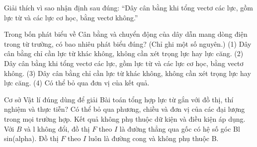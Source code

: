 \begin{bt}
Giải thích vì sao nhận định sau đúng: “Dây cân bằng khi tổng vectơ các lực, gồm lực từ và các lực cơ học, bằng vectơ không.”
\end{bt}

\begin{ex}
Trong bốn phát biểu về Cân bằng và chuyển động của dây dẫn mang dòng điện trong từ trường, có bao nhiêu phát biểu đúng? (Chỉ ghi một số nguyên.) (1) Dây cân bằng chỉ cần lực từ khác không, không cần xét trọng lực hay lực căng. (2) Dây cân bằng khi tổng vectơ các lực, gồm lực từ và các lực cơ học, bằng vectơ không. (3) Dây cân bằng chỉ cần lực từ khác không, không cần xét trọng lực hay lực căng. (4) Có thể bỏ qua đơn vị của kết quả.
\end{ex}

\begin{ex}
Cơ sở Vật lí đúng dùng để giải Bài toán tổng hợp lực từ gắn với đồ thị, thí nghiệm và thực tiễn?
\choice
{Có thể bỏ qua phương, chiều và đơn vị của các đại lượng trong mọi trường hợp.}
{Kết quả không phụ thuộc dữ kiện và điều kiện áp dụng.}
{\True Với $B$ và l không đổi, đồ thị $F$ theo $I$ là đường thẳng qua gốc có hệ số góc Bl sin(alpha).}
{Đồ thị $F$ theo $I$ luôn là đường cong và không phụ thuộc B.}
\end{ex}

